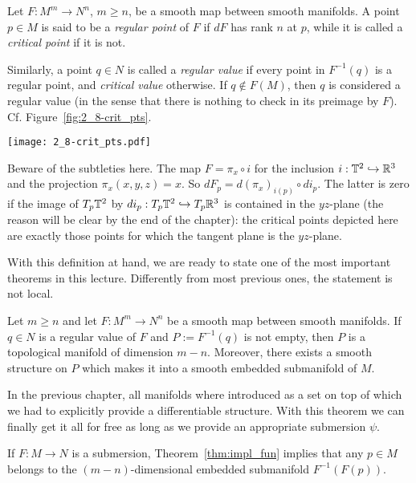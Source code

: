 \begin{definition}
  Let $F:M^m \to N^n$, $m\geq n$, be a smooth map between smooth manifolds.
  A point $p\in M$ is said to be a \emph{regular point} of $F$ if $dF$ has rank $n$ at $p$, while it is called a \emph{critical point} if it is not.

  Similarly, a point $q\in N$ is called a \emph{regular value} if every point in $F^{-1}(q)$ is a regular point, and \emph{critical value} otherwise. If $q\not\in F(M)$, then $q$ is considered a regular value (in the sense that there is nothing to check in its preimage by $F$).
  Cf. Figure~\ref{fig:2_8-crit_pts}.
\end{definition}
\begin{marginfigure}
  \texttt{[image: 2\_8-crit\_pts.pdf]}
  \caption{Beware of the subtleties here. The map $F=\pi_x\circ i$ for the inclusion $i:\mathbb{T}^2\hookrightarrow\mathbb{R}^3$ and the projection $\pi_x(x,y,z)=x$.
    So $dF_p = d (\pi_x)_{i(p)} \circ d i_p$. The latter is zero if the image of $T_p\mathbb{T}^2$ by $d i_p: T_p\mathbb{T}^2\hookrightarrow T_p\mathbb{R}^3$ is contained in the $yz$-plane (the reason will be clear by the end of the chapter): the critical points depicted here are exactly those points for which the tangent plane is the $yz$-plane.}
  \label{fig:2_8-crit_pts}
\end{marginfigure}

With this definition at hand, we are ready to state one of the most important theorems in this lecture.
Differently from most previous ones, the statement is not local.

\begin{theorem}\label{thm:impl_fun}
  Let $m\geq n$ and let $F: M^m \to N^n$ be a smooth map between smooth manifolds.
  If $q\in N$ is a regular value of $F$ and $P := F^{-1}(q)$ is not empty, then $P$ is a topological manifold of dimension $m-n$.
  Moreover, there exists a smooth structure on $P$ which makes it into a smooth embedded submanifold of $M$.
\end{theorem}

In the previous chapter, all manifolds where introduced as a set on top of which we had to explicitly provide a differentiable structure. With this theorem we can finally get it all for free as long as we provide an appropriate submersion $\psi$.

\begin{remark}
  If $F:M\to N$ is a submersion, Theorem~\ref{thm:impl_fun} implies that any $p\in M$ belongs to the $(m-n)$-dimensional embedded submanifold $F^{-1}(F(p))$.
\end{remark}

